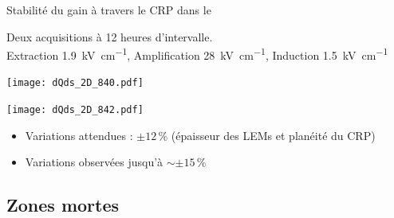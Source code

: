     \begin{frame}{Stabilité du gain à travers le CRP dans le \TOO{}}
        \begin{scriptsize}
            \centering Deux acquisitions à 12 heures d'intervalle.\\
            Extraction \SI{1.9}{\kilo\volt\per\centi\meter}, Amplification \SI{28}{\kilo\volt\per\centi\meter}, Induction \SI{1.5}{\kilo\volt\per\centi\meter}\\\vspace{0.2cm}
            \begin{center} \vspace{-0.5cm}\texttt{[image: dQds\_2D\_840.pdf]} \end{center}
            \begin{center} \vspace{-0.5cm}\texttt{[image: dQds\_2D\_842.pdf]} \end{center}
            \vspace{-0.5cm}
            \begin{itemize}
       			\item Variations attendues : $\pm 12 \,\%$ (épaisseur des LEMs et planéité du CRP)
       			\item Variations observées jusqu'à $\sim \pm15\,\%$
   			\end{itemize}
        \end{scriptsize}
    \end{frame}

  \subsection{Zones mortes}
    
